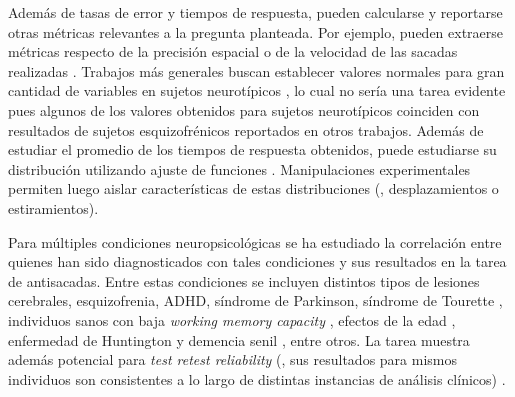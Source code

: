 Además de tasas de error y tiempos de respuesta, pueden calcularse y reportarse
otras métricas relevantes a la pregunta planteada.
Por ejemplo, pueden extraerse métricas respecto de la precisión espacial
\cite{olincy_1997_age_diminishes_performance} o de la velocidad de las
sacadas realizadas \cite{plomecka_2020_retest_reliability}.
Trabajos más generales buscan establecer valores normales para gran cantidad de
variables en sujetos neurotípicos \cite{smyrnis_2002_big_sample}, lo cual no
sería una tarea evidente pues algunos de los valores obtenidos para sujetos
neurotípicos coinciden con resultados de sujetos esquizofrénicos reportados en
otros trabajos.
Además de estudiar el promedio de los tiempos de respuesta obtenidos, puede
estudiarse su distribución utilizando ajuste de funciones
\cite{unsworth_2011_distribution_analysis}.
Manipulaciones experimentales permiten luego aislar características de estas
distribuciones (\eg, desplazamientos o estiramientos).

Para múltiples condiciones neuropsicológicas se ha estudiado la correlación
entre quienes han sido diagnosticados con tales condiciones y sus resultados en
la tarea de antisacadas.
Entre estas condiciones se incluyen distintos tipos de lesiones cerebrales,
esquizofrenia, ADHD, síndrome de Parkinson, síndrome de Tourette
\cite{munoz_2004_look_away}, individuos sanos con baja \textit{working
memory capacity} \cite{unsworth_2011_distribution_analysis}, efectos de la
edad \cite{olincy_1997_age_diminishes_performance,
plomecka_2020_retest_reliability}, enfermedad de Huntington y demencia senil
\cite{smyrnis_2002_big_sample}, entre otros.
La tarea muestra además potencial para \textit{test retest reliability}
(\ie, sus resultados para mismos individuos son consistentes a lo largo de
distintas instancias de análisis clínicos)
\cite{plomecka_2020_retest_reliability}. 

